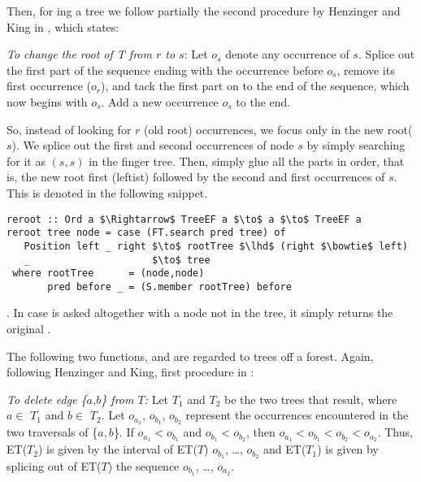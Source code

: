 Then, for ing a tree we follow partially the second procedure by Henzinger and King in \cite{Rand-DynGs-Algos}, which states:
\begin{displayquote}
\emph{To change the root of \textit{T} from $r$ to $s$}: Let $o_s$ denote any occurrence of $s$. Splice out the first part of the sequence ending with the occurrence before $o_s$, remove its first occurrence ($o_r$), and tack the first part on to the end of the sequence, which now begins with $o_s$. Add a new occurrence $o_s$ to the end.
\end{displayquote}

So, instead of looking for $r$ (old root) occurrences, we focus only in the new root($s$). We splice out the first and second occurrences of node $s$ by simply searching for it as $(s,s)$ in the finger tree. Then, simply glue all the parts in order, that is, the new root first (leftist) followed by the second and first occurrences of $s$. This is denoted in the following snippet.

\begin{lstlisting}[mathescape]
reroot :: Ord a $\Rightarrow$ TreeEF a $\to$ a $\to$ TreeEF a 
reroot tree node = case (FT.search pred tree) of
   Position left _ right $\to$ rootTree $\lhd$ (right $\bowtie$ left)
   _                     $\to$ tree
 where rootTree      = (node,node)
       pred before _ = (S.member rootTree) before
\end{lstlisting} 

. In case  is asked altogether with a node not in the tree, it simply returns the original .

The following two functions,  and  are regarded to trees off a forest. Again, following Henzinger and King, first procedure in \cite{Rand-DynGs-Algos}:
\begin{displayquote}
\emph{To delete edge \{$a$,$b$\} from $T$:} Let $T_1$ and $T_2$ be the two trees that result, where $a \in$ $T_1$ and $b \in$ $T_2$. Let $o_{a_1}$, $o_{b_1}$, $o_{b_2}$ represent the occurrences encountered in the two traversals of \{$a,b$\}. If $o_{a_1} < o_{b_1}$ and $o_{b_1} < o_{b_2}$, then $o_{a_1} < o_{b_1} < o_{b_2} < o_{a_2}$. Thus, ET($T_2$) is given by the interval of ET($T$) $o_{b_1}$, \ldots, $o_{b_2}$ and ET($T_1$) is given by splicing out of ET($T$) the sequence $o_{b_1}$, \ldots, $o_{a_2}$. 
\end{displayquote} 

